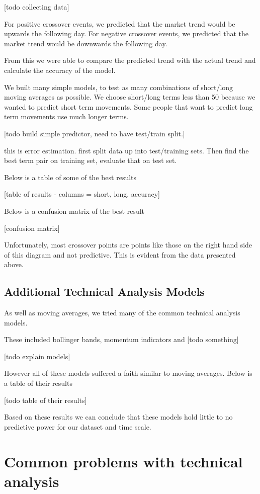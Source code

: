 \documentclass{report}
\begin{document}
[todo collecting data]

For positive crossover events, we predicted that the market trend would be upwards the following day. For negative crossover events, we predicted that the market trend would be downwards the following day. 

From this we were able to compare the predicted trend with the actual trend and calculate the accuracy of the model. 

We built many simple models, to test as many combinations of short/long moving averages as possible. We choose short/long terms less than 50 because we wanted to predict short term movements. Some people that want to predict long term movements use much longer terms.

[todo build simple predictor, need to have test/train split.]

this is error estimation. first split data up into test/training sets. Then find the best term pair on training set, evaluate that on test set.

Below is a table of some of the best results

[table of results - columns = short, long, accuracy]

Below is a confusion matrix of the best result

[confusion matrix] 

Unfortunately, most crossover points are points like those on the right hand side of this diagram and not predictive. This is evident from the data presented above.

\subsection{Additional Technical Analysis Models }

As well as moving averages, we tried many of the common technical analysis models.

These included bollinger bands, momentum indicators and [todo something]

[todo explain models]

However all of these models suffered a faith similar to moving averages. Below is a table of their results

[todo table of their results]

Based on these results we can conclude that these models hold little to no predictive power for our dataset and time scale.

\section{Common problems with technical analysis}
\end{document}
